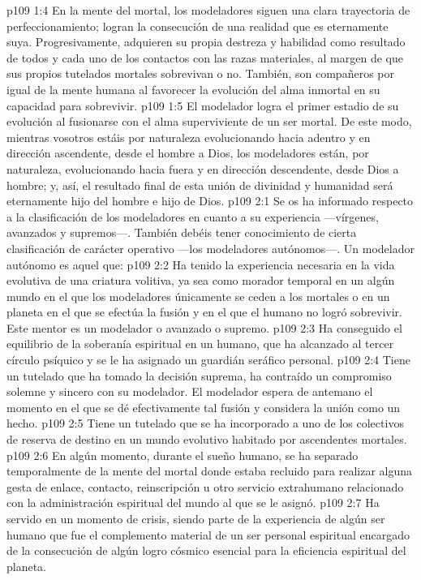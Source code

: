 \vs p109 1:4 En la mente del mortal, los modeladores siguen una clara trayectoria de perfeccionamiento; logran la consecución de una realidad que es eternamente suya. Progresivamente, adquieren su propia destreza y habilidad como resultado de todos y cada uno de los contactos con las razas materiales, al margen de que sus propios tutelados mortales sobrevivan o no. También, son compañeros por igual de la mente humana al favorecer la evolución del alma inmortal en su capacidad para sobrevivir.
\vs p109 1:5 El modelador logra el primer estadio de su evolución al fusionarse con el alma superviviente de un ser mortal. De este modo, mientras vosotros estáis por naturaleza evolucionando hacia adentro y en dirección ascendente, desde el hombre a Dios, los modeladores están, por naturaleza, evolucionando hacia fuera y en dirección descendente, desde Dios a hombre; y, así, el resultado final de esta unión de divinidad y humanidad será eternamente hijo del hombre e hijo de Dios.
\vs p109 2:1 Se os ha informado respecto a la clasificación de los modeladores en cuanto a su experiencia ---vírgenes, avanzados y supremos---. También debéis tener conocimiento de cierta clasificación de carácter operativo ---los modeladores autónomos---. Un modelador autónomo es aquel que:
\vs p109 2:2 Ha tenido la experiencia necesaria en la vida evolutiva de una criatura volitiva, ya sea como morador temporal en un algún mundo en el que los modeladores únicamente se ceden a los mortales o en un planeta en el que se efectúa la fusión y en el que el humano no logró sobrevivir. Este mentor es un modelador o avanzado o supremo.
\vs p109 2:3 Ha conseguido el equilibrio de la soberanía espiritual en un humano, que ha alcanzado al tercer círculo psíquico y se le ha asignado un guardián seráfico personal.
\vs p109 2:4 Tiene un tutelado que ha tomado la decisión suprema, ha contraído un compromiso solemne y sincero con su modelador. El modelador espera de antemano el momento en el que se dé efectivamente tal fusión y considera la unión como un hecho.
\vs p109 2:5 Tiene un tutelado que se ha incorporado a uno de los colectivos de reserva de destino en un mundo evolutivo habitado por ascendentes mortales.
\vs p109 2:6 En algún momento, durante el sueño humano, se ha separado temporalmente de la mente del mortal donde estaba recluido para realizar alguna gesta de enlace, contacto, reinscripción u otro servicio extrahumano relacionado con la administración espiritual del mundo al que se le asignó.
\vs p109 2:7 Ha servido en un momento de crisis, siendo parte de la experiencia de algún ser humano que fue el complemento material de un ser personal espiritual encargado de la consecución de algún logro cósmico esencial para la eficiencia espiritual del planeta.
